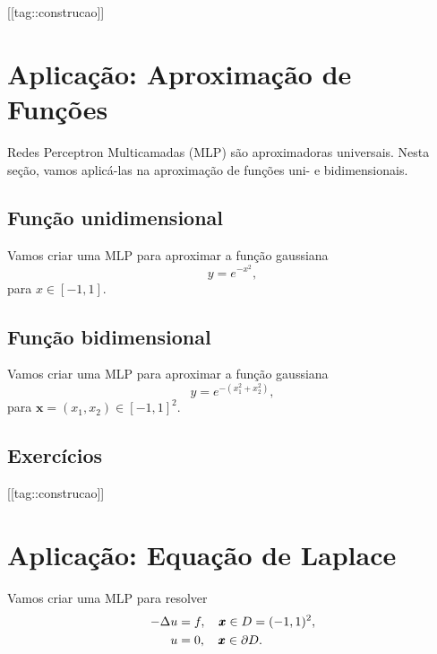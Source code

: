 [[tag::construcao]]

\section{Aplicação: Aproximação de Funções}\label{cap_mlp_sec_apfun}

Redes Perceptron Multicamadas (MLP) são aproximadoras universais. Nesta seção, vamos aplicá-las na aproximação de funções uni- e bidimensionais.

\subsection{Função unidimensional}

Vamos criar uma MLP para aproximar a função gaussiana
\begin{equation}
  y = e^{-x^2},
\end{equation}
para $x\in [-1,1]$.



\subsection{Função bidimensional}

Vamos criar uma MLP para aproximar a função gaussiana
\begin{equation}
  y = e^{-(x_1^2 + x_2^2)},
\end{equation}
para $\pmb{x} = (x_1, x_2)\in [-1,1]^2$.



\subsection{Exercícios}

[[tag::construcao]]

\section{Aplicação: Equação de Laplace}\label{cap_mlp_sec_eqlaplace}

Vamos criar uma MLP para resolver
\begin{subequations}
  \begin{align}
    -\Delta u &= f,\quad \pmb{x}\in D = (-1, 1)^2,\\
    u &= 0,\quad \pmb{x}\in\partial D.
  \end{align}
\end{subequations}

